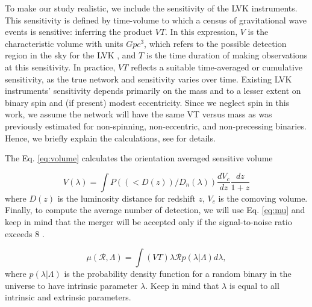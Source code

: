 \documentclass[twocolumn,prd,nofootinbib]{revtex4}
\begin{document}
To make our study realistic, we include the sensitivity of the LVK instruments. This sensitivity is defined by time-volume to which a census of gravitational wave events is sensitive: inferring the product $VT$.  In this expression, $V$ is the characteristic volume with units $Gpc^{3}$, which refers to the possible detection region in the sky for the LVK \cite{Volume_1993}, and $T$ is the time duration of making observations at this sensitivity.  In practice, $VT$ reflects a suitable time-averaged or cumulative sensitivity, as the true network and sensitivity varies over time.
Existing LVK instruments' sensitivity depends primarily on the mass and to a lesser extent on binary spin and (if present) modest eccentricity.  Since we neglect spin in this work, we assume the network will have the same  VT versus mass as was previously estimated  \cite{Dan_2019} for non-spinning, non-eccentric, and non-precessing binaries. Hence, we briefly explain the calculations, see \cite{Dan_2019} for details.

The Eq. \ref{eq:volume} calculates the orientation averaged sensitive volume \cite{Abbott_2016,richard2010volume}

\begin{equation}
\label{eq:volume}
V(\lambda) = \int P((<D(z))/D_n(\lambda))\frac{dV_c}{dz}\frac{dz}{1+z}
\end{equation}    
where $D(z)$ is the luminosity distance for redshift $z$, $V_c$ is the comoving volume. Finally, to compute the average number of detection, we will use Eq. \ref{eq:mu} and keep in mind that the merger will be accepted only if the signal-to-noise ratio exceeds 8 \cite{SNR_2010}.

\begin{equation}
\label{eq:mu}
  \mu(\mathcal{R},\Lambda) = \int(VT)\lambda \mathcal{R}p(\lambda|\Lambda)d\lambda ,
\end{equation}
where $p(\lambda|\Lambda)$ is the probability density function for a random binary in the universe to have intrinsic parameter $\lambda$. Keep in mind that $\lambda$ is equal to all intrinsic and extrinsic parameters.
\end{document}
